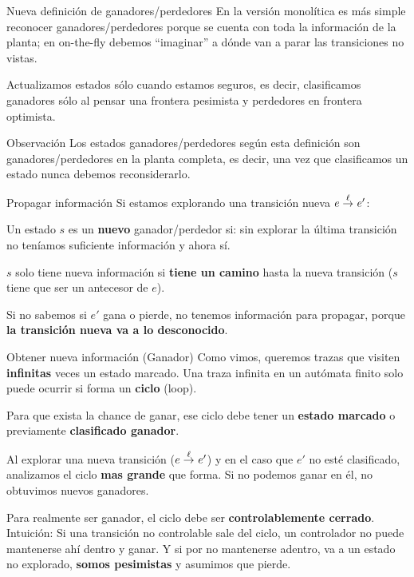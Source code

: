 \begin{frame}{Nueva definición de ganadores/perdedores}
    En la versión monolítica es más simple reconocer ganadores/perdedores porque se cuenta con toda la información de la planta; en on-the-fly debemos ``imaginar'' a dónde van a parar las transiciones no vistas.
    
    Actualizamos estados sólo cuando estamos seguros, es decir, clasificamos ganadores sólo al pensar una frontera pesimista y perdedores en frontera optimista.
    
    \begin{block}{Observación}
        Los estados ganadores/perdedores según esta definición son ganadores/perdedores en la planta completa, es decir, una vez que clasificamos un estado nunca debemos reconsiderarlo.
    \end{block}
\end{frame}
\begin{frame}{Propagar información}
	Si estamos explorando una transición nueva $e \overset{\ell}{\rightarrow}_{} e'$:
	
	\pause
	
	Un estado $s$ es un \textbf{nuevo} ganador/perdedor si: sin explorar la última transición no teníamos suficiente información y ahora sí.
	
	\pause
	
	$s$ solo tiene nueva información si \textbf{tiene un camino} hasta la nueva transición ($s$ tiene que ser un antecesor de $e$).
	
	\pause 
	
	Si no sabemos si $e'$ gana o pierde, no tenemos información para propagar, porque \textbf{la transición nueva va a lo desconocido}.

\end{frame}
\begin{frame}{Obtener nueva información (Ganador)}
	Como vimos, queremos trazas que visiten \textbf{infinitas} veces un estado marcado. \pause Una traza infinita en un autómata finito solo puede ocurrir si forma un \textbf{ciclo} (loop).
	
	\pause
		
	Para que exista la chance de ganar, ese ciclo debe tener un \textbf{estado marcado} o previamente \textbf{clasificado ganador}.
	
	\pause
	
	Al explorar una nueva transición ($e \overset{\ell}{\rightarrow}_{} e'$) y en el caso que $e'$ no esté clasificado, analizamos el ciclo \textbf{mas grande} que forma. Si no podemos ganar en él, no obtuvimos nuevos ganadores.
	
	\pause

	Para realmente ser ganador, el ciclo debe ser \textbf{controlablemente cerrado}. Intuición: Si una transición no controlable sale del ciclo, un controlador no puede mantenerse ahí dentro y ganar. Y si por no mantenerse adentro, va a un estado no explorado, \textbf{somos pesimistas} y asumimos que pierde.
\end{frame}
